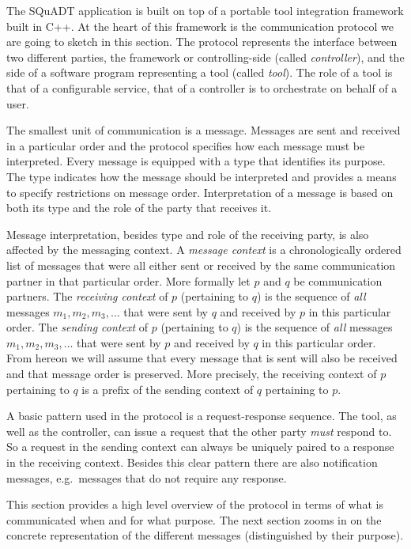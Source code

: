 \documentclass{article}
\newcommand{\squadt}{SQuADT\xspace}
\begin{document}
  The \squadt application is built on top of a portable tool integration
  framework built in C++. At the heart of this framework is the communication
  protocol we are going to sketch in this section. The protocol represents the
  interface between two different parties, the framework or controlling-side
  (called \textit{controller}), and the side of a software program representing
  a tool (called \textit{tool}). The role of a tool is that of a configurable
  service, that of a controller is to orchestrate on behalf of a user.

  The smallest unit of communication is a message. Messages are sent and
  received in a particular order and the protocol specifies how each message
  must be interpreted. Every message is equipped with a type that identifies
  its purpose.  The type indicates how the message should be interpreted and
  provides a means to specify restrictions on message order. Interpretation of
  a message is based on both its type and the role of the party that receives
  it.

  Message interpretation, besides type and role of the receiving party, is also
  affected by the messaging context.  A \textit{message context} is a
  chronologically ordered list of messages that were all either sent or
  received by the same communication partner in that particular order.  More
  formally let $p$ and $q$ be communication partners. The \textit{receiving
  context} of $p$ (pertaining to $q$) is the sequence of \emph{all} messages
  $m_{1}, m_{2}, m_{3}, \ldots$ that were sent by $q$ and received by $p$ in
  this particular order.  The \textit{sending context} of $p$ (pertaining to
  $q$) is the sequence of \emph{all} messages $m_{1}, m_{2}, m_{3}, \ldots$
  that were sent by $p$ and received by $q$ in this particular order. From
  hereon we will assume that every message that is sent will also be received
  and that message order is preserved. More precisely, the receiving context of
  $p$ pertaining to $q$ is a prefix of the sending context of $q$ pertaining to
  $p$.

  A basic pattern used in the protocol is a request-response sequence. The
  tool, as well as the controller, can issue a request that the other party
  \emph{must} respond to. So a request in the sending context can always be
  uniquely paired to a response in the receiving context. Besides this clear
  pattern there are also notification messages, e.g.\ messages that do not
  require any response.

  This section provides a high level overview of the protocol in terms of what
  is communicated when and for what purpose. The next section zooms in on the
  concrete representation of the different messages (distinguished by their
  purpose).
\end{document}
